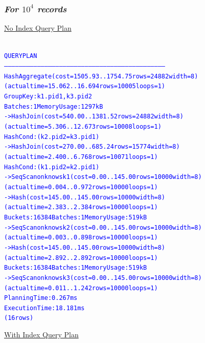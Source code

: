 \documentclass{article}
\begin{document}
    \subsubsection*{\emph{For $10^4$ records}}
    \underline{No Index Query Plan}
    \begin{center}
      {\tiny
      \begin{alltt}
      \textcolor{blue}{
        QUERY PLAN                                                             
        ------------------------------------------------------------------------------------------------------------------------------------
         HashAggregate  (cost=1505.93..1754.75 rows=24882 width=8) (actual time=15.062..16.694 rows=10005 loops=1)
           Group Key: k1.pid1, k3.pid2
           Batches: 1  Memory Usage: 1297kB
           ->  Hash Join  (cost=540.00..1381.52 rows=24882 width=8) (actual time=5.306..12.673 rows=10008 loops=1)
                 Hash Cond: (k2.pid2 = k3.pid1)
                 ->  Hash Join  (cost=270.00..685.24 rows=15774 width=8) (actual time=2.400..6.768 rows=10071 loops=1)
                       Hash Cond: (k1.pid2 = k2.pid1)
                       ->  Seq Scan on knows k1  (cost=0.00..145.00 rows=10000 width=8) (actual time=0.004..0.972 rows=10000 loops=1)
                       ->  Hash  (cost=145.00..145.00 rows=10000 width=8) (actual time=2.383..2.384 rows=10000 loops=1)
                             Buckets: 16384  Batches: 1  Memory Usage: 519kB
                             ->  Seq Scan on knows k2  (cost=0.00..145.00 rows=10000 width=8) (actual time=0.003..0.898 rows=10000 loops=1)
                 ->  Hash  (cost=145.00..145.00 rows=10000 width=8) (actual time=2.892..2.892 rows=10000 loops=1)
                       Buckets: 16384  Batches: 1  Memory Usage: 519kB
                       ->  Seq Scan on knows k3  (cost=0.00..145.00 rows=10000 width=8) (actual time=0.011..1.242 rows=10000 loops=1)
         Planning Time: 0.267 ms
         Execution Time: 18.181 ms
        (16 rows)
       }
      \end{alltt}
      }
    \end{center}
    \underline{With Index Query Plan}
\end{document}
